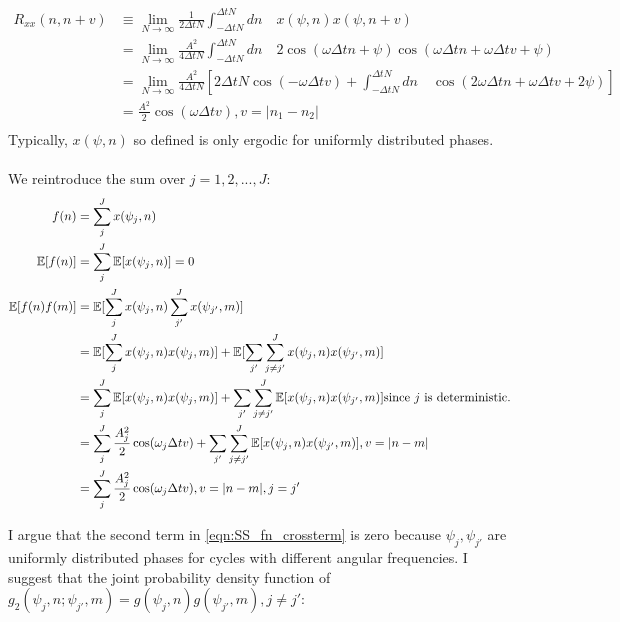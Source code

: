 \begin{align}
R_{xx}(n, n + v) & \equiv \lim_{N \to \infty} \frac{1}{2 \Delta t N} \int_{-\Delta t N}^{\Delta t N} dn \quad  x(\psi, n) x(\psi, n + v)  \\
& = \lim_{N \to \infty} \frac{A^2}{4 \Delta t N} \int_{-\Delta t N}^{\Delta t N} dn \quad 2 \cos(\omega \Delta t n + \psi) \cos(\omega \Delta t n + \omega \Delta t v + \psi) \\
& = \lim_{N \to \infty} \frac{A^2}{4 \Delta t N} [ 2\Delta t N\cos(-\omega \Delta t v)  + \int_{-\Delta t N}^{\Delta t N} dn \quad \cos(2\omega \Delta t n + \omega \Delta t v + 2\psi) ]\\
& =  \frac{A^2}{2} \cos(\omega \Delta t v), v = |n_1 -n_2| \\
\end{align}
Typically, $x(\psi, n)$ so defined is only ergodic for uniformly distributed phases. 
\\
\\
We reintroduce the sum over $j = 1, 2, ... , J$:
\begin{align}
f(n) & = \sum_j^J x(\psi_j, n) \\
\mathbb{E}[f(n)] &= \sum_j^J \mathbb{E}[x(\psi_j, n)] = 0 \\
\mathbb{E}[f(n)f(m)] &=  \mathbb{E}[\sum_j^J x(\psi_j, n) \sum_{j'}^{J} x(\psi_{j'}, m)]  \\
 & = \mathbb{E}[\sum_j^J x(\psi_j, n) x(\psi_{j}, m)] + \mathbb{E}[\sum_{j'}\sum_{j\neq j'}^J x(\psi_j, n) x(\psi_{j'}, m)] \\
  & = \sum_j^J \mathbb{E}[x(\psi_j, n) x(\psi_{j}, m)] + \sum_{j'}\sum_{j\neq j'}^J \mathbb{E}[x(\psi_j, n) x(\psi_{j'}, m)]  \text{since $j$ is deterministic.}\\
 & = \sum_j^J \frac{A_j^2}{2} \cos(\omega_j \Delta t v) + \sum_{j'}\sum_{j\neq j'}^J \mathbb{E}[x(\psi_j, n) x(\psi_{j'}, m)], v = |n - m |  \label{eqn:SS_fn_crossterm}\\
 & = \sum_j^J \frac{A_j^2}{2} \cos(\omega_j \Delta t v), v = |n - m |, j = j'
\end{align}
 
 I argue that the second term in \ref{eqn:SS_fn_crossterm} is zero because $\psi_j, \psi_{j'}$ are uniformly distributed phases for cycles with different angular frequencies.
 I suggest that the joint probability density function of $ g_2(\psi_j, n; \psi_{j'}, m) = g(\psi_j, n) g(\psi_{j'}, m), j \neq j'$:


